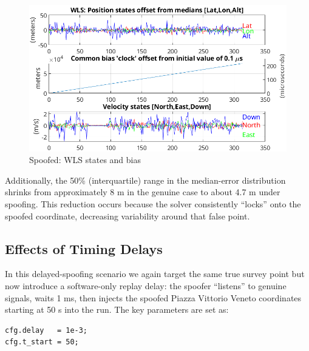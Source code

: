        \begin{figure}[h!]
            \centering
            \includegraphics[width=0.9\columnwidth]{images/tests/Monte_Cappuccini/Spoofing/task5_figures/Samsung_A51_Monte_Cappuccini_fig5.png}
            \caption{Spoofed: WLS states and bias}
        \end{figure}

        
        \noindent Additionally, the 50\% (interquartile) range in the median-error distribution shrinks from approximately 8 m in the genuine case to about 4.7 m under spoofing. 
        This reduction occurs because the solver consistently “locks” onto the spoofed coordinate, decreasing variability around that false point.

    \subsection{Effects of Timing Delays}

        In this delayed-spoofing scenario we again target the same true survey point but now introduce a software-only replay delay: the spoofer “listens” to genuine signals, waits 1 ms, then injects the spoofed Piazza Vittorio Veneto coordinates starting at 50 s into the run. 
        The key parameters are set as:

        \begin{verbatim}
cfg.delay   = 1e-3;
cfg.t_start = 50;
        \end{verbatim}


